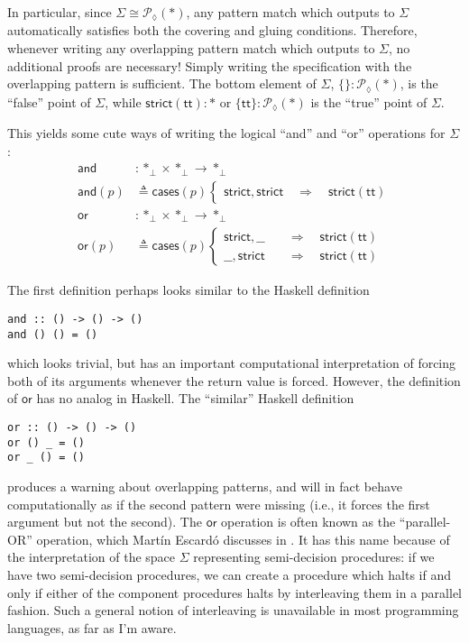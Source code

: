 \documentclass[conference]{IEEEtran}
\newcommand{\PLower}{\mathcal{P}_\lozenge}
\newcommand{\One}{\ast}
\newcommand{\Branch}{\Rightarrow}
\begin{document}
In particular, since $\Sigma \cong \PLower(\One)$, any pattern match which outputs to $\Sigma$ automatically satisfies both the covering and gluing conditions. Therefore, whenever writing any overlapping pattern match which outputs to $\Sigma$, no additional proofs are necessary! Simply writing the specification with the overlapping pattern is sufficient. The bottom element of $\Sigma$, $\{ \} : \PLower(\One)$, is the ``false'' point of $\Sigma$, while $\mathsf{strict}(\mathsf{tt}) : \One$ or $\{ \mathsf{tt} \} : \PLower(\One)$ is the ``true'' point of $\Sigma$.

This yields some cute ways of writing the logical ``and'' and ``or'' operations for $\Sigma$:
\begin{align*}
\mathsf{and} &: \One_\bot \times \One_\bot \to \One_\bot
\\ \mathsf{and}(p) &\triangleq \mathsf{cases}(p)
\begin{cases}
\mathsf{strict} , \mathsf{strict}
  \quad \Branch \quad \mathsf{strict}(\mathsf{tt})
\end{cases}
\\
\mathsf{or} &: \One_\bot \times \One_\bot \to \One_\bot
\\ \mathsf{or}(p) &\triangleq \mathsf{cases}(p)
\begin{cases}
\mathsf{strict} , \_\_
  \quad &\Branch \quad \mathsf{strict}(\mathsf{tt})
\\  \_\_ , \mathsf{strict}
  \quad &\Branch \quad \mathsf{strict}(\mathsf{tt})
\end{cases}
\end{align*}

The first definition perhaps looks similar to the Haskell definition
\begin{verbatim}
and :: () -> () -> ()
and () () = ()
\end{verbatim}
which looks trivial, but has an important computational interpretation of forcing both of its arguments whenever the return value is forced. However, the definition of $\mathsf{or}$ has no analog in Haskell. The ``similar'' Haskell definition
\begin{verbatim}
or :: () -> () -> ()
or () _ = ()
or _ () = ()
\end{verbatim}
produces a warning about overlapping patterns, and will in fact behave computationally as if the second pattern were missing (i.e., it forces the first argument but not the second). The $\mathsf{or}$ operation is often known as the ``parallel-OR'' operation, which Mart\'in Escard\'o discusses in \cite{escardo2004}. It has this name because of the interpretation of the space $\Sigma$ representing semi-decision procedures: if we have two semi-decision procedures, we can create a procedure which halts if and only if either of the component procedures halts by interleaving them in a parallel fashion. Such a general notion of interleaving is unavailable in most programming languages, as far as I'm aware.
\end{document}
